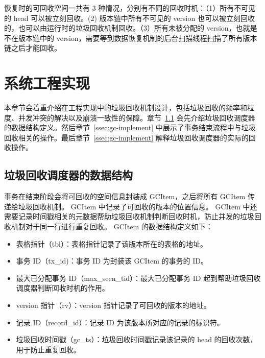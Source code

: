 恢复时的可回收空间一共有 3 种情况，分别有不同的回收时机：（1）所有不可见的 head 可以被立刻回收。(2) 版本链中所有不可见的 version 也可以被立刻回收的，也可以由运行时的垃圾回收机制回收。（3）所有未被分配的 version，也就是不在版本链中的 version，需要等到数据恢复机制的后台扫描线程扫描了所有版本链之后才能回收。


\section{系统工程实现}
\label{sec:implement}

本章节会着重介绍在工程实现中的垃圾回收机制设计，包括垃圾回收的频率和粒度、并发冲突的解决以及崩溃一致性的保障。章节~\ref{ssec:gc-metadata} 会先介绍垃圾回收调度器的数据结构定义。然后章节~\ref{ssec:gc-implement} 中展示了事务结束流程中与垃圾回收相关的操作。最后章节~\ref{ssec:gc-implement} 解释垃圾回收调度器的实际的回收操作。

\subsection{垃圾回收调度器的数据结构}
\label{ssec:gc-metadata}


事务在结束阶段会将可回收的空间信息封装成 GCItem，之后将所有 GCItem 传递给垃圾回收机制。
GCItem 中记录了可回收的版本的位置信息。
GCItem 中还需要记录时间戳相关的元数据帮助垃圾回收机制判断回收时机，防止并发的垃圾回收机制对于同一行进行重复回收。
GCItem 的数据结构定义如下：
\begin{itemize}
    \item 表格指针（tbl）：表格指针记录了该版本所在的表格的地址。
    \item 事务 ID（tx\_id)：事务 ID 为封装该 GCItem 的事务的 ID。
    \item 最大已分配事务 ID（max\_seen\_tid）：最大已分配事务 ID 起到帮助垃圾回收调度器判断回收时机的作用。
    \item version 指针（rv）：version 指针记录了可回收的版本的地址。
    \item 记录 ID（record\_id）：记录 ID 为该版本所对应的记录的标识符。
    \item 垃圾回收时间戳（gc\_ts）：垃圾回收时间戳记录该记录的 head 的回收次数，用于防止重复回收。
\end{itemize}

